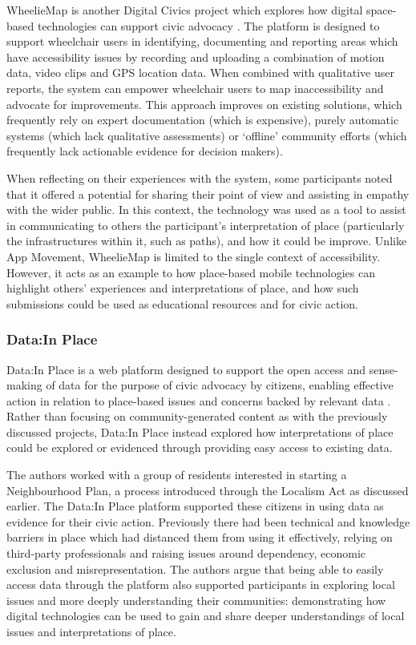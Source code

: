WheelieMap is another Digital Civics project which explores how digital space-based technologies can support civic advocacy \citep{Kirkham2017}. The platform is designed to support wheelchair users in identifying, documenting and reporting areas which have accessibility issues by recording and uploading a combination of motion data, video clips and GPS location data. When combined with qualitative user reports, the system can empower wheelchair users to map inaccessibility and advocate for improvements. This approach improves on existing solutions, which frequently rely on expert documentation (which is expensive), purely automatic systems (which lack qualitative assessments) or `offline' community efforts (which frequently lack actionable evidence for decision makers). 

When reflecting on their experiences with the system, some participants noted that it offered a potential for sharing their point of view and assisting in empathy with the wider public. In this context, the technology was used as a tool to assist in communicating to others the participant's interpretation of place (particularly the infrastructures within it, such as paths), and how it could be improve. Unlike App Movement, WheelieMap is limited to the single context of accessibility. However, it acts as an example to how place-based mobile technologies can highlight others' experiences and interpretations of place, and how such submissions could be used as educational resources and for civic action.

\subsubsection{Data:In Place}
Data:In Place is a web platform designed to support the open access and sense-making of data for the purpose of civic advocacy by citizens, enabling effective action in relation to place-based issues and concerns backed by relevant data \citep{Puussaar2018}. Rather than focusing on community-generated content as with the previously discussed projects, Data:In Place instead explored how interpretations of place could be explored or evidenced through providing easy access to existing data.

The authors worked with a group of residents interested in starting a Neighbourhood Plan, a process introduced through the Localism Act as discussed earlier. The Data:In Place platform supported these citizens in using data as evidence for their civic action. Previously there had been technical and knowledge barriers in place which had distanced them from using it effectively, relying on third-party professionals and raising issues around dependency, economic exclusion and misrepresentation. The authors argue that being able to easily access data through the platform also supported participants in exploring local issues and more deeply understanding their communities: demonstrating how digital technologies can be used to gain and share deeper understandings of local issues and interpretations of place.

